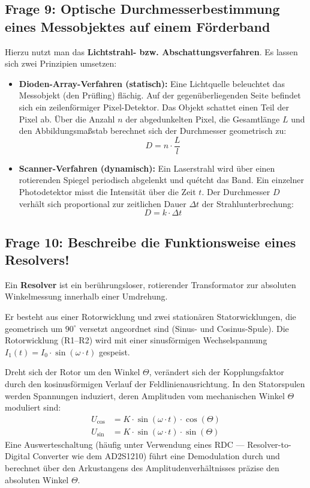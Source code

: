 \documentclass[12pt,a4paper]{article}
\begin{document}
\subsection*{Frage 9: Optische Durchmesserbestimmung eines Messobjektes auf einem Förderband}

Hierzu nutzt man das \textbf{Lichtstrahl- bzw. Abschattungsverfahren}. Es lassen sich zwei Prinzipien umsetzen:
\begin{itemize}
    \item \textbf{Dioden-Array-Verfahren (statisch):} Eine Lichtquelle beleuchtet das Messobjekt (den Prüfling) flächig. Auf der gegenüberliegenden Seite befindet sich ein zeilenförmiger Pixel-Detektor. Das Objekt schattet einen Teil der Pixel ab. Über die Anzahl $n$ der abgedunkelten Pixel, die Gesamtlänge $L$ und den Abbildungsmaßstab berechnet sich der Durchmesser geometrisch zu:
    \begin{equation}
        D = n \cdot \frac{L}{l}
    \end{equation}
    \item \textbf{Scanner-Verfahren (dynamisch):} Ein Laserstrahl wird über einen rotierenden Spiegel periodisch abgelenkt und quétcht das Band. Ein einzelner Photodetektor misst die Intensität über die Zeit $t$. Der Durchmesser $D$ verhält sich proportional zur zeitlichen Dauer $\Delta t$ der Strahlunterbrechung:
    \begin{equation}
        D = k \cdot \Delta t
    \end{equation}
\end{itemize}

\subsection*{Frage 10: Beschreibe die Funktionsweise eines Resolvers!}

Ein \textbf{Resolver} ist ein berührungsloser, rotierender Transformator zur absoluten Winkelmessung innerhalb einer Umdrehung. 

Er besteht aus einer Rotorwicklung und zwei stationären Statorwicklungen, die geometrisch um $90^{\circ}$ versetzt angeordnet sind (Sinus- und Cosinus-Spule). Die Rotorwicklung (R1--R2) wird mit einer sinusförmigen Wechselspannung $I_1(t) = I_0 \cdot \sin(\omega \cdot t)$ gespeist. 

Dreht sich der Rotor um den Winkel $\Theta$, verändert sich der Kopplungsfaktor durch den kosinusförmigen Verlauf der Feldlinienausrichtung. In den Statorspulen werden Spannungen induziert, deren Amplituden vom mechanischen Winkel $\Theta$ moduliert sind:
\begin{align}
    U_{\text{cos}} &= K \cdot \sin(\omega \cdot t) \cdot \cos(\Theta) \\
    U_{\text{sin}} &= K \cdot \sin(\omega \cdot t) \cdot \sin(\Theta)
\end{align}
Eine Auswerteschaltung (häufig unter Verwendung eines RDC --- Resolver-to-Digital Converter wie dem AD2S1210) führt eine Demodulation durch und berechnet über den Arkustangens des Amplitudenverhältnisses präzise den absoluten Winkel $\Theta$.
\end{document}
